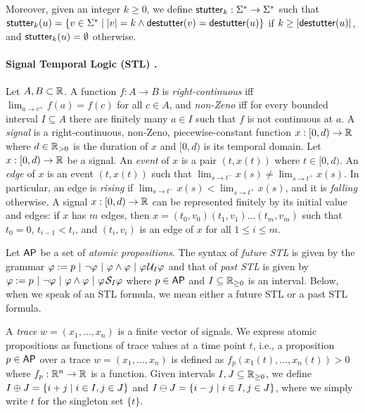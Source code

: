 Moreover, given an integer $k \geq 0$, we define $\mathsf{stutter}_k : \Sigma^* \to \Sigma^*$ such that $\stutter_k(u) = \{v \in \Sigma^* \st |v| = k \land \destutter(v) = \destutter(u)\}$ if $k \geq |\mathsf{destutter}(u)|$, and $\mathsf{stutter}_k(u) = \emptyset$ otherwise.

\paragraph*{Signal Temporal Logic (STL) \cite{MalerN13}.}
Let $A,B \subset \mathbb{R}$.
%
A function $f : A \to B$ is
\emph{right-continuous} iff $\lim_{a \to c^+} f(a) = f(c)$ for all $c \in A$, and
\emph{non-Zeno} iff for every bounded interval $I \subseteq A$ there are finitely many $a \in I$ such that $f$ is not continuous at $a$.
%
A \emph{signal} is a right-continuous, non-Zeno, piecewise-constant function $x : [0,d) \to \mathbb{R}$ where $d \in \mathbb{R}_{> 0}$ is the duration of $x$ and $[0,d)$ is its temporal domain.
Let $x : [0,d) \to \mathbb{R}$ be a signal.
An \emph{event} of $x$ is a pair $(t, x(t))$ where $t \in [0,d)$.
An \emph{edge} of $x$ is an event $(t, x(t))$ such that $\lim_{s \to t^-} x(s) \neq \lim_{s \to t^+} x(s)$.
In particular, an edge is \emph{rising} if $\lim_{s \to t^-} x(s) < \lim_{s \to t^+} x(s)$, and it is \emph{falling} otherwise.
A signal $x : [0,d) \to \mathbb{R}$ can be represented finitely by its initial value and edges: if $x$ has $m$ edges, then $x = (t_0, v_0) (t_1, v_1) \ldots (t_m, v_m)$ such that $t_0 = 0$, $t_{i-1} < t_i$, and $(t_i, v_i)$ is an edge of $x$ for all $1 \leq i \leq m$.

\bgroup \color{red}
Let $\mathsf{AP}$ be a set of \emph{atomic propositions}.
The syntax of \emph{future STL} is given by the grammar $\varphi :=  p ~|~ \lnot \varphi ~|~ \varphi \land \varphi ~|~ \varphi \kern.1em\mathcal{U}_I \varphi$ and that of \emph{past STL} is given by $\varphi :=  p ~|~ \lnot \varphi ~|~ \varphi \land \varphi ~|~ \varphi \kern.1em\mathcal{S}_I \varphi$ where $p \in \mathsf{AP}$ and $I \subseteq \mathbb{R}_{\geq 0}$ is an interval.
Below, when we speak of an STL formula, we mean either a future STL or a past STL formula.

A \emph{trace} $w = (x_1, \ldots, x_n)$ is a finite vector of signals.
We express atomic propositions as functions of trace values at a time point $t$,
i.e., a proposition $p \in \mathsf{AP}$ over a trace $w = (x_1, \ldots, x_n)$ is defined as $f_p(x_1(t), \ldots, x_n(t)) > 0$ where $f_p : \mathbb{R}^n \to \mathbb{R}$ is a function.
Given intervals $I,J \subseteq \mathbb{R}_{\geq 0}$, we define $I \oplus J = \{i + j \st i \in I , j \in J\}$ and $I \ominus J = \{i - j \st i \in I , j \in J\}$, where we simply write $t$ for the singleton set $\{t\}$. 

